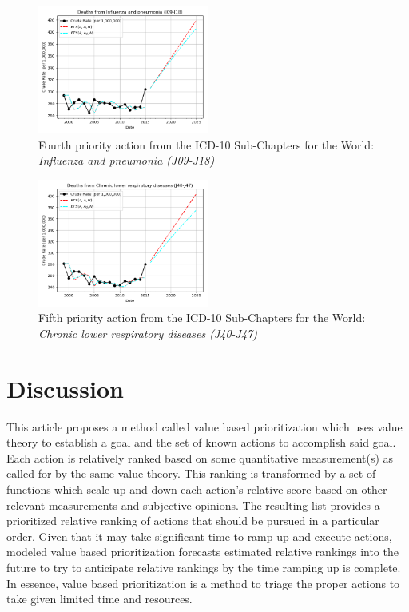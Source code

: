 \documentclass[10pt, a4paper, twocolumn]{IEEEconf}
\begin{document}
\begin{figure}[H]
  \centering
  \includegraphics[width=0.5\textwidth]{results/WORLD_ICD10_SUB_CHAPTERS/Influenza_and_pneumonia_J09-J18_ets.png}
  \caption{Fourth priority action from the ICD-10 Sub-Chapters for the World: \textit{Influenza and pneumonia (J09-J18)}}\label{fig:k11d}
\end{figure}

\begin{figure}[H]
  \centering
  \includegraphics[width=0.5\textwidth]{results/WORLD_ICD10_SUB_CHAPTERS/Chronic_lower_respiratory_diseases_J40-J47_ets.png}
  \caption{Fifth priority action from the ICD-10 Sub-Chapters for the World: \textit{Chronic lower respiratory diseases (J40-J47)}}\label{fig:k11e}
\end{figure}

\clearpage

\section{Discussion}

This article proposes a method called value based prioritization which uses value theory to establish a goal and the set of known actions to accomplish said goal.
Each action is relatively ranked based on some quantitative measurement(s) as called for by the same value theory.
This ranking is transformed by a set of functions which scale up and down each action's relative score based on other relevant measurements and subjective opinions.
The resulting list provides a prioritized relative ranking of actions that should be pursued in a particular order.
Given that it may take significant time to ramp up and execute actions, modeled value based prioritization forecasts estimated relative rankings into the future to try to anticipate relative rankings by the time ramping up is complete.
In essence, value based prioritization is a method to triage the proper actions to take given limited time and resources.
\end{document}

